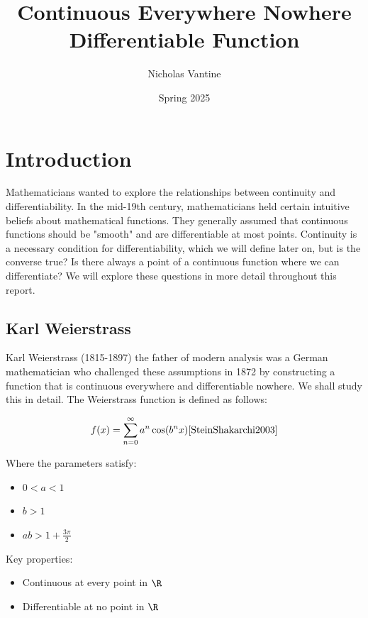 \documentclass[fontsize=14pt]{scrartcl}
\title{Continuous Everywhere Nowhere Differentiable Function}
\author{Nicholas Vantine}
\date{Spring 2025}
\begin{document}
\maketitle
\newpage
\tableofcontents


\newpage


\section{Introduction}
Mathematicians wanted to explore the relationships between continuity and differentiability.
In the mid-19th century, mathematicians held certain intuitive beliefs about mathematical functions. They generally assumed that continuous functions should be "smooth" and are differentiable at most points. Continuity is a necessary condition for differentiability, which we will define later on, but is the converse true? Is there always a point of a continuous function where we can differentiate? We will explore these questions in more detail throughout this report. \cite{wiki:Weierstrass_function}

\subsection*{Karl Weierstrass} 
Karl Weierstrass (1815-1897) the father of modern analysis was a German mathematician who challenged these assumptions in 1872 by constructing a function that is continuous everywhere and differentiable nowhere. \cite{wiki:Karl_Weierstrass} We shall study this in detail.
The Weierstrass function is defined as follows:

\begin{equation}
f(x) = \sum_{n=0}^{\infty} a^n \cos(b^n x) \cite{SteinShakarchi2003}
\end{equation}

Where the parameters satisfy:
\begin{itemize}
    \item $0 < a < 1$
    \item $b > 1$
    \item $ab > 1 + \frac{3\pi}{2}$
\end{itemize}

Key properties:
\begin{itemize}
    \item Continuous at every point in $\R$
    \item Differentiable at no point in $\R$
\end{itemize}
\end{document}
